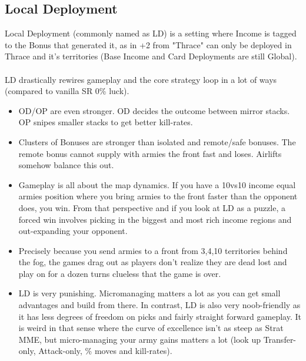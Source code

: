 \subsection{Local Deployment}

Local Deployment (commonly named as LD) is a setting where Income is tagged to the Bonus that generated it, as in +2 from "Thrace" can only be deployed in Thrace and it's territories (Base Income and Card Deployments are still Global).
\\
\\
LD drastically rewires gameplay and the core strategy loop in a lot of ways (compared to vanilla SR 0\% luck).
\begin{itemize}
    \item OD/OP are even stronger. OD decides the outcome between mirror stacks. OP snipes smaller stacks to get better kill-rates.
    \item Clusters of Bonuses are stronger than isolated and remote/safe bonuses. The remote bonus cannot supply with armies the front fast and loses. Airlifts somehow balance this out.
    \item Gameplay is all about the map dynamics. If you have a 10vs10 income equal armies position where you bring armies to the front faster than the opponent does, you win. From that perspective and if you look at LD as a puzzle, a forced win involves picking in the biggest and most rich income regions and out-expanding your opponent.
    \item Precisely because you send armies to a front from 3,4,10 territories behind the fog, the games drag out as players don't realize they are dead lost and play on for a dozen turns clueless that the game is over.
    \item LD is very punishing. Micromanaging matters a lot as you can get small advantages and build from there. In contrast, LD is also very noob-friendly as it has less degrees of freedom on picks and fairly straight forward gameplay. It is weird in that sense where the curve of excellence isn't as steep as Strat MME, but micro-managing your army gains matters a lot (look up Transfer-only, Attack-only, \% moves and kill-rates).
\end{itemize}